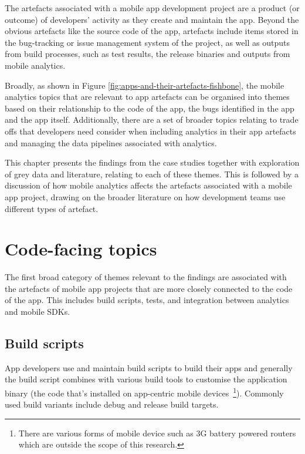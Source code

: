 The artefacts associated with a mobile app development project are a product (or outcome) of developers' activity as they create and maintain the app. Beyond the obvious artefacts like the source code of the app, artefacts include items stored in the bug-tracking or issue management system of the project, as well as outputs from build processes, such as test results, the release binaries and outputs from mobile analytics.

Broadly, as shown in Figure \ref{fig:apps-and-their-artefacts-fishbone}, the mobile analytics topics that are relevant to app artefacts can be organised into themes based on their relationship to the code of the app, the bugs identified in the app and the app itself. Additionally, there are a set of broader topics relating to trade offs that developers need consider when including analytics in their app artefacts and managing the data pipelines associated with analytics.

This chapter presents the findings from the case studies together with exploration of grey data and literature, relating to each of these themes. This is followed by a discussion of how mobile analytics affects the artefacts associated with a mobile app project, drawing on the broader literature on how development teams use different types of artefact.




\section{Code-facing topics}
The first broad category of themes relevant to the findings are associated with the artefacts of mobile app projects that are more closely connected to the code of the app. This includes build scripts, tests, and integration between analytics and mobile SDKs.

\subsection{Build scripts}
App developers use and maintain build scripts to build their apps and generally the build script combines with various build tools to customise the application binary (the code that's installed on app-centric mobile devices~\footnote{There are various forms of mobile device such as 3G battery powered routers which are outside the scope of this research.}). Commonly used build variants include debug and release build targets. 

